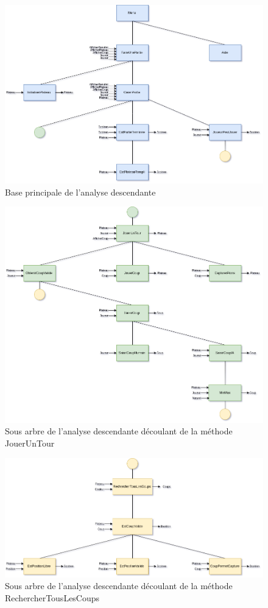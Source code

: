 \begin{figure}[h]
  \includegraphics[width=18cm]{./sourcesIMAGES/analyse_main.png}
  \caption{Base principale de l'analyse descendante}
\end{figure}
\newpage
\begin{figure}[h]
  \includegraphics[width=18cm]{./sourcesIMAGES/analyse_jouerUnTour.png}
  \caption{Sous arbre de l'analyse descendante découlant de la méthode JouerUnTour}
\end{figure}
\begin{figure}[h]
  \includegraphics[width=18cm]{./sourcesIMAGES/analyse_chercherTousLesCoups.png}
  \caption{Sous arbre de l'analyse descendante découlant de la méthode RechercherTousLesCoups}
\end{figure}
